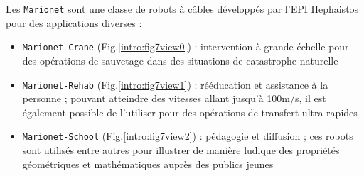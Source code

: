 Les {\tt Marionet} sont une classe de robots à câbles développés par l'EPI 
Hephaistos pour des applications diverses :
\begin{itemize}
 \item {\tt Marionet-Crane} (Fig.\ref{intro:fig7view0}) : intervention à grande 
échelle pour des opé\-rations de sauvetage dans des situations de catastrophe 
naturelle
 \item {\tt Marionet-Rehab} (Fig.\ref{intro:fig7view1}) : rééducation et 
assistance à la personne ; pouvant atteindre des vitesses allant jusqu'à 100m/s, 
il est également possible de l'utiliser pour des opérations de transfert 
ultra-rapides
 \item {\tt Marionet-School} (Fig.\ref{intro:fig7view2}) : pédagogie et 
diffusion ; ces robots sont utilisés entre autres pour illustrer de manière 
ludique des propriétés géométriques et mathématiques auprès des publics jeunes
\end{itemize}

